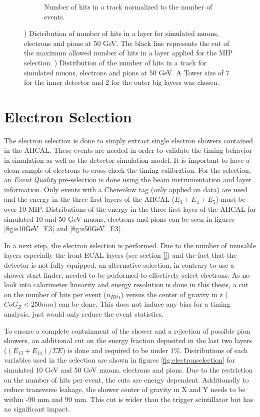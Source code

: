 \begin{figure}[htbp!]
\begin{subfigure}[t]{0.5\textwidth}
		\caption{Number of hits in a track normalized to the number of events.} \label{fig:Muons_Track_nHits}
	\end{subfigure}
	\caption{) Distribution of number of hits in a layer for simulated muons, electrons and pions at 50 GeV. The black line represents the cut of the maximum allowed number of hits in a layer applied for the MIP selection. ) Distribution of the number of hits in a track for simulated muons, electrons and pions at 50 GeV. A Tower size of 7 for the inner detector and 2 for the outer big layers was chosen.}
\end{figure}

\section{Electron Selection}
\label{subsec:elec_sel}

The electron selection is done to simply extract single electron showers contained in the AHCAL. These events are needed in order to validate the timing behavior in simulation as well as the detector simulation model. It is important to have a clean sample of electrons to cross-check the timing calibration. For the selection, an \textit{Event Quality} pre-selection is done using the beam instrumentation and layer information. Only events with a Cherenkov tag (only applied on data) are used and the energy in the three first layers of the AHCAL ($E_3+E_4+E_5$) must be over 10 MIP. Distributions of the energy in the three first layer of the AHCAL for simulated 10 and 50 GeV muons, electrons and pions can be seen in figures \ref{fig:e10GeV_E3} and \ref{fig:e50GeV_E3}.

In a next step, the electron selection is performed. Due to the number of unusable layers especially the front ECAL layers (see section \ref{}) and the fact that the detector is not fully equipped, an alternative selection, in contrary to use a shower start finder, needed to be performed to effectively select electrons. As no look into calorimeter linearity and energy resolution is done in this thesis, a cut on the number of hits per event ($n_{Hits}$) versus the center of gravity in z ($CoG_Z < 250 mm$) can be done. This does not induce any bias for a timing analysis, just would only reduce the event statistics.

To ensure a complete containment of the shower and a rejection of possible pion showers, an additional cut on the energy fraction deposited in the last two layers ($(E_{13}+E_{14})/\Sigma E$) is done and required to be under 1\%. Distributions of each variables used in the selection are shown in figures \ref{fig:electronselection} for simulated 10 GeV and 50 GeV muons, electrons and pions. Due to the restriction on the number of hits per event, the cuts are energy dependent. Additionally to reduce transverse leakage, the shower center of gravity in X and Y needs to be within -90 mm and 90 mm. This cut is wider than the trigger scintillator but has no significant impact.

